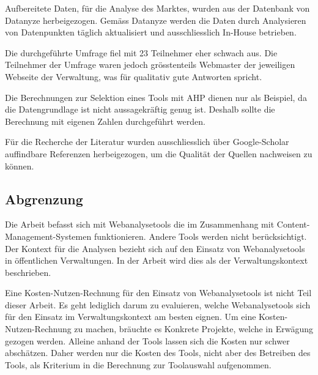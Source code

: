 Aufbereitete Daten, für die Analyse des Marktes, wurden aus der Datenbank von Datanyze \parencite{datanyzeSwitzerlandWebanalytics} herbeigezogen. Gemäss Datanyze \parencite{datanyzeFAQ} werden die Daten durch Analysieren von Datenpunkten täglich aktualisiert und ausschliesslich In-House betrieben.

Die durchgeführte Umfrage fiel mit 23 Teilnehmer eher schwach aus. Die Teilnehmer der Umfrage waren jedoch grösstenteils Webmaster der jeweiligen Webseite der Verwaltung, was für qualitativ gute Antworten spricht.

Die Berechnungen zur Selektion eines Tools mit AHP dienen nur als Beispiel, da die Datengrundlage ist nicht aussagekräftig genug ist. Deshalb sollte die Berechnung mit eigenen Zahlen durchgeführt werden. 

Für die Recherche der Literatur wurden ausschliesslich über Google-Scholar auffindbare Referenzen herbeigezogen, um die Qualität der Quellen nachweisen zu können.

\subsection{Abgrenzung}
Die Arbeit befasst sich mit Webanalysetools die im Zusammenhang mit Content-Management-Systemen funktionieren. Andere Tools werden nicht berücksichtigt. Der Kontext für die Analysen bezieht sich auf den Einsatz von Webanalysetools in öffentlichen Verwaltungen. In der Arbeit wird dies als der Verwaltungskontext beschrieben. 

Eine Kosten-Nutzen-Rechnung für den Einsatz von Webanalysetools ist nicht Teil dieser Arbeit. Es geht lediglich darum zu evaluieren, welche Webanalysetools sich für den Einsatz im Verwaltungskontext am besten eignen. Um eine Kosten-Nutzen-Rechnung zu machen, bräuchte es Konkrete Projekte, welche in Erwägung gezogen werden. Alleine anhand der Tools lassen sich die Kosten nur schwer abschätzen. Daher werden nur die Kosten des  Tools, nicht aber des Betreiben des Tools, als Kriterium in die Berechnung zur Toolauswahl aufgenommen. 